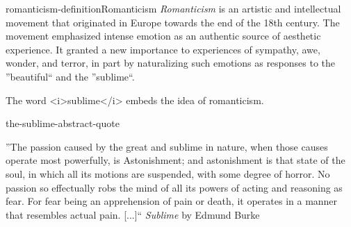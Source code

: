 \documentclass[preview]{standalone}
\begin{document}
\genpage

\begin{snippetdefinition}{romanticism-definition}{Romanticism}
    \textit{Romanticism} is an artistic and intellectual movement that originated
    in Europe towards the end of the 18th century.
    The movement emphasized intense emotion as an authentic source of aesthetic experience.
    It granted a new importance to experiences of sympathy, awe, wonder, and terror,
    in part by naturalizing such emotions as responses to the ''beautiful`` and the ''sublime``.
\end{snippetdefinition}

\begin{plainhtml}
    The word <i>sublime</i> embeds the idea of romanticism.
\end{plainhtml}

\begin{snippet}{the-sublime-abstract-quote}
    \begin{displayquote}
    ''The passion caused by the great and sublime in nature, when those causes operate most powerfully, is Astonishment; and astonishment is that state of the soul, in which all its motions are suspended, with some degree of horror. No passion so effectually robs the mind of all its powers of acting and reasoning as fear. For fear being an apprehension of pain or death, it operates in a manner that resembles actual pain. [...]``
    \textit{Sublime} by Edmund Burke
    \end{displayquote}
\end{snippet}
\end{document}
